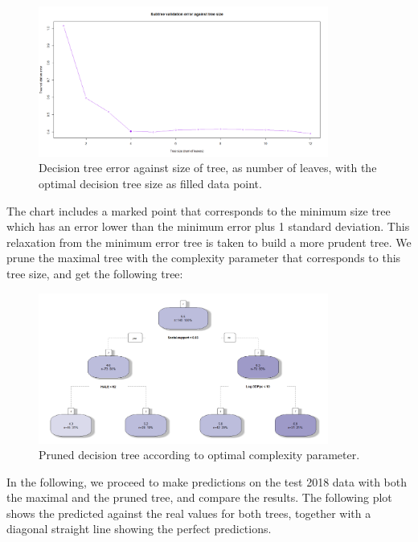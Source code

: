 \documentclass[12pt]{extarticle}
\begin{document}
\begin{figure}[H]
  \centering
    \includegraphics[width=0.85\textwidth]{figures/tree-error.png}
    \caption{Decision tree error against size of tree, as number of leaves, with the optimal decision tree size as filled data point.\label{fig:tree_error}}
\end{figure}

The chart includes a marked point that corresponds to the minimum size tree which has an error lower than the minimum error plus 1 standard deviation. This relaxation from the minimum error tree is taken to build a more prudent tree. We prune the maximal tree with the complexity parameter that corresponds to this tree size, and get the following tree:

\begin{figure}[H]
  \centering
    \includegraphics[width=0.85\textwidth]{figures/tree-pruned.png}
    \caption{Pruned decision tree according to optimal complexity parameter.\label{fig:tree_pruned}}
\end{figure}


In the following, we proceed to make predictions on the test 2018 data with both the maximal and the pruned tree, and compare the results. The following plot shows the predicted against the real values for both trees, together with a diagonal straight line showing the perfect predictions.
\end{document}
